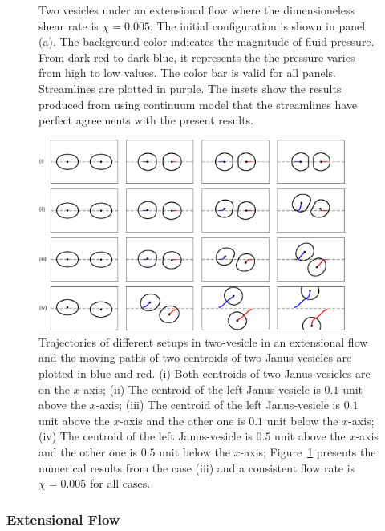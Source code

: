 \documentclass[lineno]{jfm}
\begin{document}
\begin{figure}
  \caption{Two vesicles under an extensional flow where the dimensioneless shear rate is $\chi=0.005$; The initial configuration is shown in panel (a). The background color indicates the magnitude of fluid pressure. From dark red to dark blue, it represents the the pressure varies from high to low values. The color bar is valid for all panels. Streamlines are plotted in purple. The insets show the results produced from using continuum model that the streamlines have perfect agreements with the present results.
  }
    \label{figure11}
\end{figure}


\begin{figure}
\begin{center}
\includegraphics[width=0.9\textwidth]{ExtTraj.eps}
\end{center} 
  \caption{Trajectories of different setups in two-vesicle in an extensional flow and the moving paths of two centroids of two Janus-vesicles are plotted in blue and red. (i) Both centroids of two Janus-vesicles are on the $x$-axis; (ii) The centroid of the left Janus-vesicle is $0.1$ unit above the $x$-axis; (iii) 
  The centroid of the left Janus-vesicle is $0.1$ unit above the $x$-axis and the other one is $0.1$ unit below the $x$-axis; (iv) The centroid of the left Janus-vesicle is $0.5$ unit above the $x$-axis and the other one is $0.5$ unit below the $x$-axis; Figure~\ref{figure11} presents the numerical results from the case (iii) and a 
  consistent flow rate is $\chi = 0.005$ for all cases.}
    \label{figure12}
\end{figure}



\subsubsection{Extensional Flow}
\end{document}
